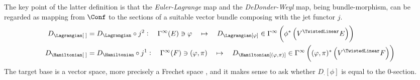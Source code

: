 \documentclass[a4paper,12pt,fleqn]{scrartcl}  %
\begin{document}
The key point of the latter definition is that the \emph{Euler-Lagrange} map and the \emph{DeDonder-Weyl} map, being bundle-morphism, can be regarded as mapping from $\Conf$ to the sections of a suitable vector bundle composing with the jet functor $j$.
%
\begin{align*}
	D_\Lagrangian[\; ] &= 
	D_\Lagrangian \circ j^2 : \quad \Gamma^\infty(E) \ni \varphi \quad \mapsto \quad D_\Lagrangian[ \varphi ] \in \Gamma^\infty \left( \phi^\ast \left(V^\TwistedLinear E \right)\right) \\
	D_\Hamiltonian[\; ] &= 
	D_\Hamiltonian \circ j^1 : \quad \Gamma^\infty(F) \ni (\varphi,\pi) \quad \mapsto \quad D_\Hamiltonian[ (\varphi,\pi) ] \in \Gamma^\infty \left( (\varphi,\pi)^\ast \left(V^\TwistedLinear F \right)\right)
\end{align*}
%
The target base is a vector space, more precisely a Frechet space \cite[Cap.2]{Ban}, and it makes sense to ask whether $D_\cdot [\phi]$ is equal to the 0-section.
\end{document}
